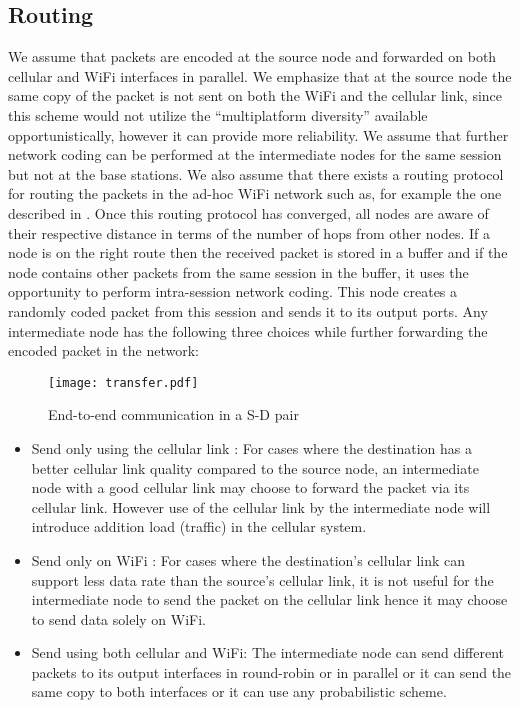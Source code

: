 \documentclass{sig-alternate-10pt}
\begin{document}
\subsection{Routing}
We assume that packets are encoded at the source node and forwarded on both cellular and WiFi interfaces in parallel. We emphasize that at the source node the same copy of the packet is not sent on both the  WiFi and the cellular link, since this scheme would not utilize the ``multiplatform diversity'' available opportunistically, however it can provide more reliability. We assume that further network coding can be performed at the intermediate nodes for the same session but not at the base stations. 
We also assume that there exists a  routing protocol for routing the packets in the ad-hoc WiFi network such as, for example the one described in  \cite{cjkk06}. Once this routing protocol has converged, all nodes are aware of their respective distance in terms of the number of hops from other nodes. 
If a node is on the right route then the received packet is stored in a buffer and if the node contains  other packets from the same session in the buffer, it uses the opportunity to perform intra-session network coding. This node creates a randomly coded packet from this session and sends it to its output ports. Any intermediate node has the following three choices while further forwarding the encoded packet  in the network:
\begin{figure}[t]
\begin{center}
\texttt{[image: transfer.pdf]}
\end{center}
\caption{End-to-end communication in a S-D pair}
\label{fig:transfer}
\end{figure} 

\begin{itemize}
  \item Send only using the cellular link : For cases where the destination has a better cellular link quality compared to the source node, an intermediate node with a good cellular link may choose to forward the packet via its cellular link. However use of the cellular link by the intermediate node will introduce addition load (traffic) in the cellular system.  
  \item Send only on WiFi : For cases where the destination's cellular link can support less data rate than the source's cellular link, it is not useful for the intermediate node to send the packet on  the cellular link hence it may choose to send data solely on WiFi.
  \item Send using both cellular and WiFi: The intermediate node can  send different  packets to its output interfaces in round-robin or in parallel or it can send the same copy to both interfaces or it can use any probabilistic scheme. 
\end{itemize}
   
\end{document}
